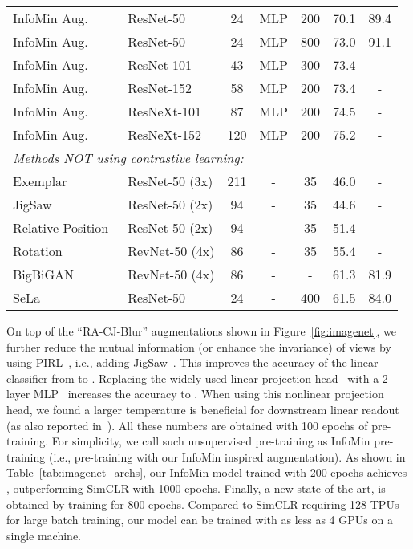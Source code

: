 \documentclass{article}
\begin{document}
\begin{table}[ht]
\begin{tabular}{llccccc}
InfoMin Aug. & ResNet-50   & 24  & MLP    & 200 & 70.1 & 89.4 \\
InfoMin Aug. & ResNet-50   & 24  & MLP    & 800 & 73.0 & 91.1 \\
InfoMin Aug. & ResNet-101   & 43  & MLP    & 300 & 73.4 & - \\
InfoMin Aug. & ResNet-152   & 58  & MLP    & 200 & 73.4 & - \\
InfoMin Aug. & ResNeXt-101  & 87  & MLP    & 200 & 74.5 & - \\
InfoMin Aug. & ResNeXt-152  & 120 & MLP    & 200 & 75.2 & - \\
\midrule
\multicolumn{7}{l}{\textit{Methods NOT using contrastive
learning:}}\\
Exemplar~\cite{dosovitskiy2014discriminative,kolesnikov2019revisiting} & ResNet-50 (3x) & 211 & - & 35 & 46.0 & -\\
JigSaw~\cite{noroozi2016unsupervised,kolesnikov2019revisiting}   & ResNet-50 (2x) & 94 & - & 35 & 44.6 & -\\
Relative Position~\cite{doersch2015unsupervised,kolesnikov2019revisiting}  & ResNet-50 (2x) & 94 & - & 35 & 51.4 & -\\
Rotation~\cite{gidaris2018unsupervised,kolesnikov2019revisiting} & RevNet-50 (4x) & 86 & - & 35 & 55.4 & -\\
BigBiGAN~\cite{donahue2019large} & RevNet-50 (4x) & 86 & - & -  & 61.3 & 81.9\\
SeLa~\cite{Asano2020} & ResNet-50 & 24 & - & 400  & 61.5 & 84.0\\
\bottomrule
\end{tabular}
\end{table} 
On top of the ``RA-CJ-Blur'' augmentations shown in Figure~\ref{fig:imagenet}, we further reduce the mutual information (or enhance the invariance) of views by using PIRL~\cite{misra2019self}, i.e., adding JigSaw~\cite{noroozi2016unsupervised}. This improves the accuracy of the linear classifier from  to . Replacing the widely-used linear projection head~\cite{wu2018unsupervised,tian2019contrastive,he2019momentum} with a 2-layer MLP~\cite{chen2020simple} increases the accuracy to . When using this nonlinear projection head, we found a larger temperature is beneficial for downstream linear readout (as also reported in~\cite{chen2020improved}). All these numbers are obtained with 100 epochs of pre-training. For simplicity, we call such unsupervised pre-training as InfoMin pre-training (i.e., pre-training with our InfoMin inspired augmentation). As shown in Table~\ref{tab:imagenet_archs},
our InfoMin model trained with 200 epochs achieves , outperforming SimCLR with 1000 epochs. Finally, a new state-of-the-art,  is obtained by training for 800 epochs. Compared to SimCLR requiring 128 TPUs for large batch training, our model can be trained with as less as 4 GPUs on a single machine.
\end{document}
